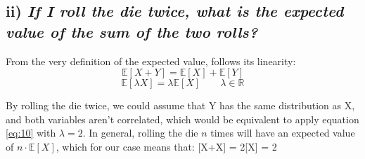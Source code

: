 \documentclass[11pt]{scrartcl} %
\begin{document}
        \subsection*{ii) {\it If I roll the die twice, what is the expected value of the sum of the two rolls?}}
        From the very definition of the expected value, follows its linearity:
        \begin{equation}\label{eq:9}
          \mathbb{E}[X+Y] = \mathbb{E}[X]+ \mathbb{E}[Y]
        \end{equation}
        \begin{equation}\label{eq:10}
          \mathbb{E}[\lambda X] = \lambda \mathbb{E}[X] \qquad \lambda \in \mathbb{R}
        \end{equation}

        By rolling the die twice, we could assume that Y has the same distribution as X, and both variables aren't correlated, which would be equivalent to apply equation \ref{eq:10} with \(\lambda=2\). In general, rolling the die \(n\) times will have an expected value of \(n\cdot \mathbb{E}[X]\), which for our case means that:
        [X+X] = 2\cdot {}[X] = 2 \cdot {} 
\end{document}
